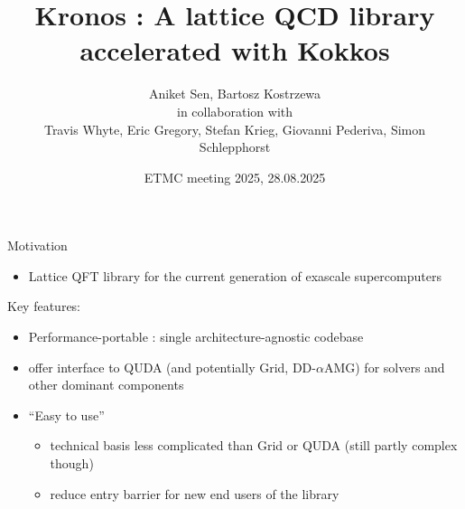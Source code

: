
\graphicspath{{graphics/}}

\title[Kronos]{Kronos : A lattice QCD library accelerated with Kokkos}
\author[A. Sen, B. Kostrzewa]{Aniket Sen, Bartosz Kostrzewa  \\ \vspace{0.2cm} in collaboration with \\ \vspace{0.2cm} \centering Travis Whyte, Eric Gregory, Stefan Krieg, Giovanni Pederiva, Simon Schlepphorst}
\date[ETMC meeting 2025]{\small ETMC meeting 2025, 28.08.2025}
\subject{subject}




\begin{frame}
  \titlepage{}
\end{frame}


\begin{frame}{Motivation}
  \begin{itemize}
    \item Lattice QFT library for the current generation of exascale supercomputers
  \end{itemize} 
  \vspace{0.5cm}
  Key features: \\
  \begin{itemize}
    \item Performance-portable : single architecture-agnostic codebase
    \vspace{0.6cm}
    \item offer interface to QUDA (and potentially Grid, DD-$\alpha$AMG) for solvers and other dominant components
    \vspace{0.6cm}
    \item ``Easy to use''
    \vspace{0.3cm}
    \begin{itemize}
      \item technical basis less complicated than Grid or QUDA (still partly complex though)
      \vspace{0.6cm}
      \item reduce entry barrier for new end users of the library
    \end{itemize}
  \end{itemize}
\end{frame}

